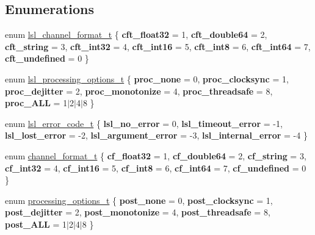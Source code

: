 \subsection*{Enumerations}
\begin{DoxyCompactItemize}
\item 
enum \hyperlink{namespacelsl_af188e978739868560b53dbf0ddd58e66}{lsl\+\_\+channel\+\_\+format\+\_\+t} \{ \newline
{\bfseries cft\+\_\+float32} = 1, 
{\bfseries cft\+\_\+double64} = 2, 
{\bfseries cft\+\_\+string} = 3, 
{\bfseries cft\+\_\+int32} = 4, 
\newline
{\bfseries cft\+\_\+int16} = 5, 
{\bfseries cft\+\_\+int8} = 6, 
{\bfseries cft\+\_\+int64} = 7, 
{\bfseries cft\+\_\+undefined} = 0
 \}
\item 
enum \hyperlink{namespacelsl_a71fa5faeecfdd863828bdcd4117e736b}{lsl\+\_\+processing\+\_\+options\+\_\+t} \{ \newline
{\bfseries proc\+\_\+none} = 0, 
{\bfseries proc\+\_\+clocksync} = 1, 
{\bfseries proc\+\_\+dejitter} = 2, 
{\bfseries proc\+\_\+monotonize} = 4, 
\newline
{\bfseries proc\+\_\+threadsafe} = 8, 
{\bfseries proc\+\_\+\+A\+LL} = 1$\vert$2$\vert$4$\vert$8
 \}
\item 
enum \hyperlink{namespacelsl_a7e674c7665887951b952c463258451a9}{lsl\+\_\+error\+\_\+code\+\_\+t} \{ \newline
{\bfseries lsl\+\_\+no\+\_\+error} = 0, 
{\bfseries lsl\+\_\+timeout\+\_\+error} = -\/1, 
{\bfseries lsl\+\_\+lost\+\_\+error} = -\/2, 
{\bfseries lsl\+\_\+argument\+\_\+error} = -\/3, 
\newline
{\bfseries lsl\+\_\+internal\+\_\+error} = -\/4
 \}
\item 
enum \hyperlink{namespacelsl_a28d50dae6fd82eea8893ce3d63ccd46c}{channel\+\_\+format\+\_\+t} \{ \newline
{\bfseries cf\+\_\+float32} = 1, 
{\bfseries cf\+\_\+double64} = 2, 
{\bfseries cf\+\_\+string} = 3, 
{\bfseries cf\+\_\+int32} = 4, 
\newline
{\bfseries cf\+\_\+int16} = 5, 
{\bfseries cf\+\_\+int8} = 6, 
{\bfseries cf\+\_\+int64} = 7, 
{\bfseries cf\+\_\+undefined} = 0
 \}
\item 
enum \hyperlink{namespacelsl_aaa1cffa7d29bb2756522bc2bb069e310}{processing\+\_\+options\+\_\+t} \{ \newline
{\bfseries post\+\_\+none} = 0, 
{\bfseries post\+\_\+clocksync} = 1, 
{\bfseries post\+\_\+dejitter} = 2, 
{\bfseries post\+\_\+monotonize} = 4, 
\newline
{\bfseries post\+\_\+threadsafe} = 8, 
{\bfseries post\+\_\+\+A\+LL} = 1$\vert$2$\vert$4$\vert$8
 \}
\end{DoxyCompactItemize}
